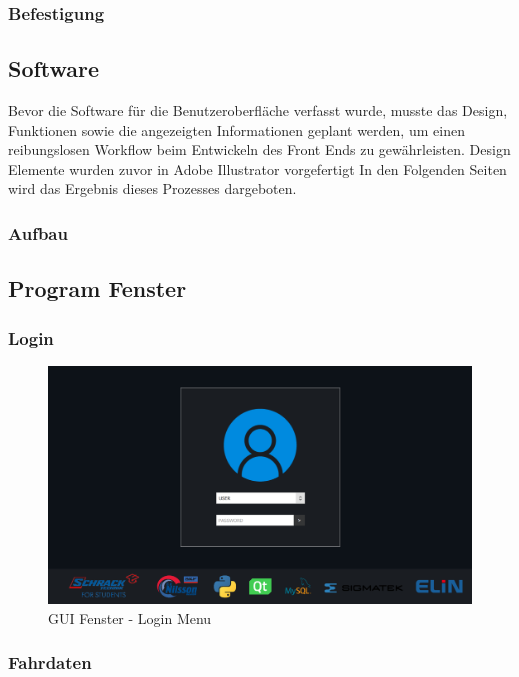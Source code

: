 \subsubsection{Befestigung}

\subsection{Software}
Bevor die Software für die Benutzeroberfläche verfasst wurde, musste das Design, Funktionen sowie die angezeigten Informationen geplant werden, um einen reibungslosen Workflow beim Entwickeln des Front Ends zu gewährleisten. Design Elemente wurden zuvor in Adobe Illustrator vorgefertigt In den Folgenden Seiten wird das Ergebnis dieses Prozesses dargeboten.
\subsubsection{Aufbau}


\subsection{Program Fenster}

\subsubsection{Login}

\begin{figure}[H]
	\begin{center}
		\includegraphics[scale=0.24]{figures/hcis/window_login.png}
		\caption{GUI Fenster - Login Menu}
	\end{center}
\end{figure}

\subsubsection{Fahrdaten}

